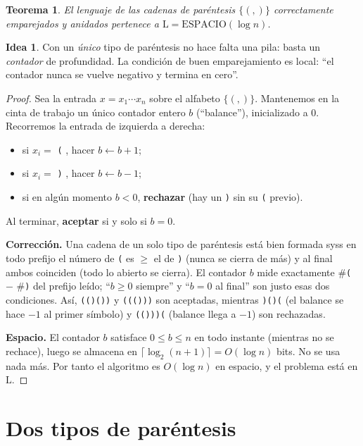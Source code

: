 \documentclass[11pt,a4paper]{article}
\theoremstyle{plain}
\newtheorem{teorema}{Teorema}
\theoremstyle{definition}
\newtheorem*{idea}{Idea}
\newcommand{\Lclass}{\mathrm{L}}
\newcommand{\SPACE}{\mathrm{ESPACIO}}
\begin{document}
\begin{teorema}
El lenguaje de las cadenas de par\'entesis $\{(,)\}$ correctamente emparejados y
anidados pertenece a $\Lclass=\SPACE(\log n)$.
\end{teorema}

\begin{idea}
Con un \emph{\'unico} tipo de par\'entesis no hace falta una pila: basta un
\emph{contador} de profundidad. La condici\'on de buen emparejamiento es local:
``el contador nunca se vuelve negativo y termina en cero''.
\end{idea}

\begin{proof}
Sea la entrada $x=x_1\cdots x_n$ sobre el alfabeto $\{(,)\}$. Mantenemos en la cinta
de trabajo un \'unico contador entero $b$ (``balance''), inicializado a $0$.
Recorremos la entrada de izquierda a derecha:
\begin{itemize}[nosep]
  \item si $x_i = $ \verb|(| , hacer $b\leftarrow b+1$;
  \item si $x_i = $ \verb|)| , hacer $b\leftarrow b-1$;
  \item si en alg\'un momento $b<0$, \textbf{rechazar} (hay un \verb|)| sin
        su \verb|(| previo).
\end{itemize}
Al terminar, \textbf{aceptar} si y solo si $b=0$.

\textbf{Correcci\'on.} Una cadena de un solo tipo de par\'entesis est\'a bien formada
syss en todo prefijo el n\'umero de \verb|(| es $\ge$ el de \verb|)| (nunca se cierra
de m\'as) y al final ambos coinciden (todo lo abierto se cierra). El contador $b$
mide exactamente \#\verb|(| $-$ \#\verb|)| del prefijo le\'ido; ``$b\ge 0$ siempre''
y ``$b=0$ al final'' son justo esas dos condiciones. As\'i,
\verb|(()())| y \verb|((()))| son aceptadas, mientras \verb|)()(| (el balance se
hace $-1$ al primer s\'imbolo) y \verb|(()))(| (balance llega a $-1$) son
rechazadas.

\textbf{Espacio.} El contador $b$ satisface $0\le b\le n$ en todo instante (mientras
no se rechace), luego se almacena en $\lceil\log_2(n+1)\rceil = O(\log n)$ bits. No se
usa nada m\'as. Por tanto el algoritmo es $O(\log n)$ en espacio, y el problema est\'a
en $\Lclass$.
\end{proof}

\section{Dos tipos de par\'entesis}
\end{document}
